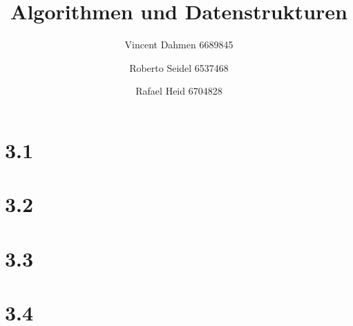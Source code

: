 \documentclass[12pt,a4paper]{article}
\title{Algorithmen und Datenstrukturen}
\author{Vincent Dahmen 6689845 \and Roberto Seidel 6537468 \and Rafael Heid 6704828}
\begin{document}
\maketitle{}


\section*{3.1}


\section*{3.2}


\section*{3.3}


\section*{3.4}

\end{document}
